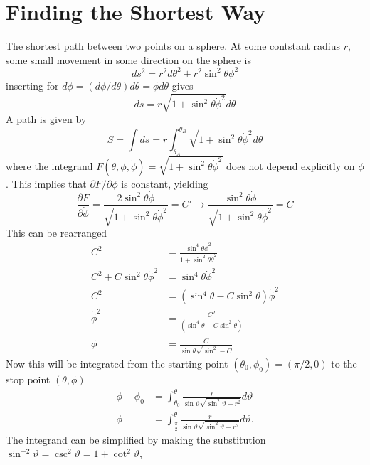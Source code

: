 \documentclass[11pt]{amsart}
\begin{document}
\section{Finding the Shortest Way}
The shortest path between two points on a sphere. At some contstant radius $r$, some small movement in some direction on the sphere is
\begin{equation}
ds^2 = r^2d\theta^2 + r^2\sin^2\theta\phi^2 
\end{equation}
inserting for $d\phi = (d\phi/d\theta)d\theta = \dot{\phi}d\theta$ gives
\begin{equation}
ds = r\sqrt{1 +\sin^2\theta\dot{\phi}^2}d\theta
\end{equation}
A path is given by
\begin{equation}
S = \int ds = r \int_{\theta_A}^{\theta_B} \sqrt{1 + \sin^2\theta\dot{\phi}^2}d\theta
\end{equation}
where the integrand $F(\theta, \phi, \dot{\phi}) = \sqrt{1 + \sin^2\theta\dot{\phi}^2}$ does not depend explicitly on $\phi$. This implies that $\partial F/ \partial \dot{\phi}$ is constant, yielding
\begin{equation}
\frac{\partial F}{\partial \dot{\phi}} = \frac{2\sin^2\theta\dot{\phi}}{\sqrt{1 + \sin^2\theta\dot{\phi}^2}} = C' \rightarrow \frac{\sin^2\theta\dot{\phi}}{\sqrt{1 + \sin^2\theta\dot{\phi}^2}} = C  
\end{equation}
This can be rearranged
\begin{align*}
C^2 &= \frac{\sin^4\theta\dot{\phi}^2}{1 + \sin^2\theta\dot{\theta}^2} \\
C^2 + C\sin^2\theta\dot{\phi}^2 &= \sin^4\theta\dot{\phi}^2 \\
C^2 &= (\sin^4\theta - C\sin^2\theta)\dot{\phi}^2 \\
\dot{\phi}^2 &= \frac{C^2}{(\sin^4\theta - C\sin^2\theta)} \\
\dot{\phi} &= \frac{C}{\sin\theta\sqrt{\sin^2 - C}}
\end{align*}
Now this will be integrated from the starting point $(\theta_0, \phi_0) = (\pi/2,0)$ to the stop point $(\theta,\phi)$
\begin{align*}
\phi - \phi_0 &= \int_{\theta_0}^{\theta} \frac{r}{\sin\vartheta\sqrt{\sin^2\vartheta-r^2}}d\vartheta \\
\phi &= \int_{\frac{\pi}{2}}^{\theta} \frac{r}{\sin\vartheta\sqrt{\sin^2\vartheta-r^2}}d\vartheta.
\end{align*}
The integrand can be simplified by making the substitution $\sin^{-2}\vartheta = \csc^2\vartheta = 1 + \cot^2\vartheta$,
\end{document}
